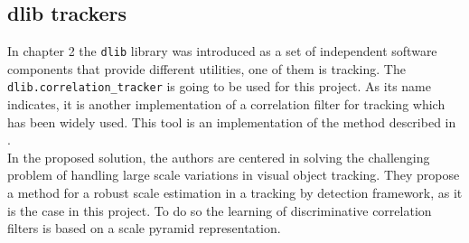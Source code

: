 \subsection{dlib trackers}
In chapter 2 the \texttt{dlib} library was introduced as a set of independent software components that provide different utilities, one of them is tracking. The \texttt{dlib.correlation\_tracker} is going to be used for this project. As its name indicates, it is another implementation of a correlation filter for tracking which has been widely used. This tool is an implementation of the method described in \cite{danelljan2014accurate}.\\ In the proposed solution, the authors are centered in solving the challenging problem of handling large scale variations in visual object tracking. They propose a method for a robust scale estimation in a tracking by detection framework, as it is the case in this project. To do so the learning of discriminative correlation filters is based on a scale pyramid representation.
